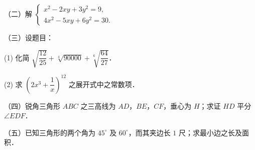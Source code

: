 \begin{question}
（二）解 $\begin{cases}x^2-2xy+3y^2=9,\\4x^2-5xy+6y^2=30.\end{cases}$

\end{question}
\begin{question}
（三）设题目：

  (1) 化简 $\sqrt{\dfrac{12}{25}}+\sqrt[4]{90000}+\sqrt[6]{\dfrac{64}{27}}$．

  (2) 求 $\left(2x^3+\dfrac1x\right)^{12}$ 之展开式中之常数项．

\end{question}
\begin{question}
（四）锐角三角形 $ABC$ 之三高线为 $AD$，$BE$，$CF$，垂心为 $H$；求证 $HD$ 平分 $\angle EDF$．

\end{question}
\begin{question}
（五）已知三角形的两个角为 $45^\circ$ 及 $60^\circ$，而其夹边长 $1$ 尺；求最小边之长及面积．

\end{question}
